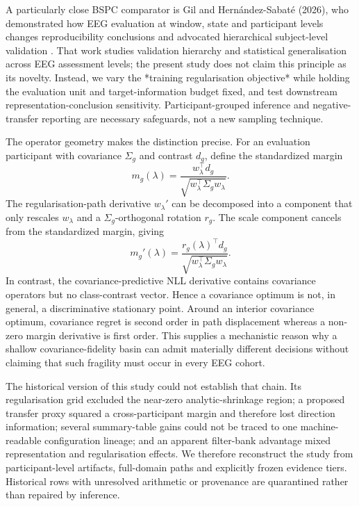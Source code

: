 A particularly close BSPC comparator is Gil and Hern{\'a}ndez-Sabat{\'e}
(2026), who demonstrated how EEG evaluation at window, state and participant
levels changes reproducibility conclusions and advocated hierarchical
subject-level validation \cite{gil2026subjectvalidation}. That work studies
validation hierarchy and statistical generalisation across EEG assessment
levels; the present study does not claim this principle as its novelty.
Instead, we vary the *training regularisation objective* while holding the
evaluation unit and target-information budget fixed, and test downstream
representation-conclusion sensitivity. Participant-grouped inference and
negative-transfer reporting are necessary safeguards, not a new sampling
technique.

The operator geometry makes the distinction precise. For an evaluation
participant with covariance \(\Sigma_g\) and contrast \(d_g\), define the
standardized margin
\[
 m_g(\lambda)=
 \frac{w_\lambda^\top d_g}
 {\sqrt{w_\lambda^\top\Sigma_gw_\lambda}}.
\]
The regularisation-path derivative \(w_\lambda'\) can be decomposed into a
component that only rescales \(w_\lambda\) and a
\(\Sigma_g\)-orthogonal rotation \(r_g\). The scale component cancels from
the standardized margin, giving
\[
 m_g'(\lambda)=
 \frac{r_g(\lambda)^\top d_g}
 {\sqrt{w_\lambda^\top\Sigma_gw_\lambda}}.
\]
In contrast, the covariance-predictive NLL derivative contains covariance
operators but no class-contrast vector. Hence a covariance optimum is not, in
general, a discriminative stationary point. Around an interior covariance
optimum, covariance regret is second order in path displacement whereas a
non-zero margin derivative is first order. This supplies a mechanistic reason
why a shallow covariance-fidelity basin can admit materially different
decisions without claiming that such fragility must occur in every EEG cohort.

The historical version of this study could not establish that chain. Its
regularisation grid excluded the near-zero analytic-shrinkage region; a
proposed transfer proxy squared a cross-participant margin and therefore lost
direction information; several summary-table gains could not be traced to one
machine-readable configuration lineage; and an apparent filter-bank advantage
mixed representation and regularisation effects. We therefore reconstruct the
study from participant-level artifacts, full-domain paths and explicitly
frozen evidence tiers. Historical rows with unresolved arithmetic or
provenance are quarantined rather than repaired by inference.

